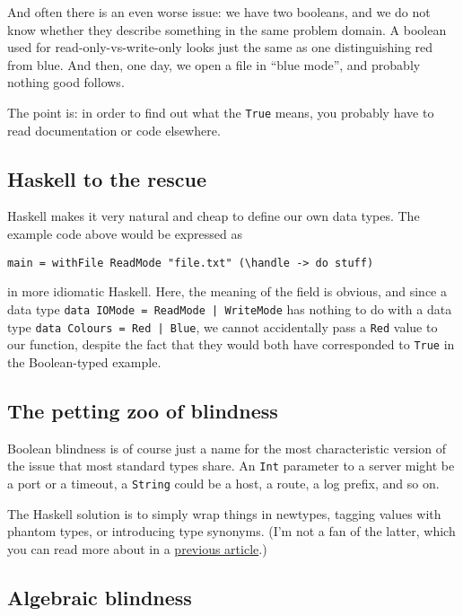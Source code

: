 And often there is an even worse issue: we have two booleans, and we do not know whether they describe something in the same problem domain. A boolean used for read-only-vs-write-only looks just the same as one distinguishing red from blue. And then, one day, we open a file in ``blue mode'', and probably nothing good follows.

The point is: in order to find out what the \texttt{True} means, you probably have to read documentation or code elsewhere.



\subsection{Haskell to the rescue}

Haskell makes it very natural and cheap to define our own data types. The example code above would be expressed as

\begin{verbatim}
main = withFile ReadMode "file.txt" (\handle -> do stuff)
\end{verbatim}
in more idiomatic Haskell. Here, the meaning of the field is obvious, and since a data type \texttt{data IOMode = ReadMode | WriteMode} has nothing to do with a data type \texttt{data Colours = Red | Blue}, we cannot accidentally pass a \texttt{Red} value to our function, despite the fact that they would both have corresponded to \texttt{True} in the Boolean-typed example.




\subsection{The petting zoo of blindness}


Boolean blindness is of course just a name for the most characteristic version of the issue that most standard types share. An \texttt{Int} parameter to a server might be a port or a timeout, a \texttt{String} could be a host, a route, a log prefix, and so on.

The Haskell solution is to simply wrap things in newtypes, tagging values with phantom types, or introducing type synonyms. (I'm not a fan of the latter, which you can read more about in a \href{https://github.com/quchen/articles/blob/master/tag-dont-type.md}{previous article}.)



\subsection{Algebraic blindness}


